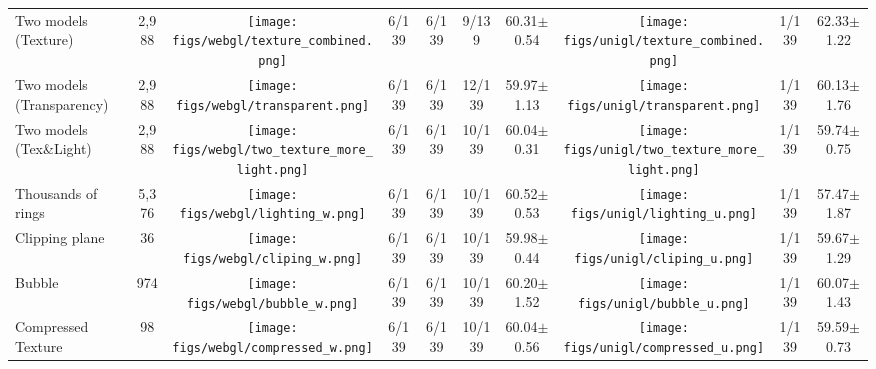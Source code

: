 \begin{table*}[t]
\begin{tabular}{lccccccccc}
\footnotesize Two models (Texture) & \footnotesize 2,988 & \texttt{[image: figs/webgl/texture\_combined.png]} & \footnotesize 6/139& \footnotesize 6/139& \footnotesize 9/139 & \footnotesize 60.31$\pm$0.54  & \texttt{[image: figs/unigl/texture\_combined.png]} & \footnotesize 1/139 & \footnotesize 62.33$\pm$1.22 \\
\footnotesize Two models (Transparency) & \footnotesize 2,988 & \texttt{[image: figs/webgl/transparent.png]} & \footnotesize 6/139& \footnotesize 6/139& \footnotesize 12/139 & \footnotesize 59.97$\pm$1.13  & \texttt{[image: figs/unigl/transparent.png]} & \footnotesize 1/139 & \footnotesize 60.13$\pm$1.76 \\
\footnotesize Two models (Tex\&Light) & \footnotesize 2,988 & \texttt{[image: figs/webgl/two\_texture\_more\_light.png]} & \footnotesize 6/139& \footnotesize 6/139& \footnotesize 10/139 & \footnotesize 60.04$\pm$0.31  & \texttt{[image: figs/unigl/two\_texture\_more\_light.png]} & \footnotesize 1/139 & \footnotesize 59.74$\pm$0.75\\
\footnotesize Thousands of rings & \footnotesize 5,376 & \texttt{[image: figs/webgl/lighting\_w.png]} & \footnotesize 6/139& \footnotesize 6/139& \footnotesize 10/139 & \footnotesize 60.52$\pm$0.53  & \texttt{[image: figs/unigl/lighting\_u.png]} & \footnotesize 1/139 & \footnotesize 57.47$\pm$1.87\\
\footnotesize Clipping plane & \footnotesize 36 & \texttt{[image: figs/webgl/cliping\_w.png]} & \footnotesize 6/139& \footnotesize 6/139& \footnotesize 10/139 & \footnotesize 59.98$\pm$0.44  & \texttt{[image: figs/unigl/cliping\_u.png]} & \footnotesize 1/139 & \footnotesize 59.67$\pm$1.29\\
\footnotesize Bubble & \footnotesize 974 & \texttt{[image: figs/webgl/bubble\_w.png]} & \footnotesize 6/139& \footnotesize 6/139& \footnotesize 10/139 & \footnotesize 60.20$\pm$1.52  & \texttt{[image: figs/unigl/bubble\_u.png]} & \footnotesize 1/139 & \footnotesize 60.07$\pm$1.43\\
\footnotesize Compressed Texture & \footnotesize 98 & \texttt{[image: figs/webgl/compressed\_w.png]} & \footnotesize 6/139& \footnotesize 6/139& \footnotesize 10/139 & \footnotesize 60.04$\pm$0.56  & \texttt{[image: figs/unigl/compressed\_u.png]} & \footnotesize 1/139 & \footnotesize 59.59$\pm$0.73\\

\end{tabular}
\end{table*}
